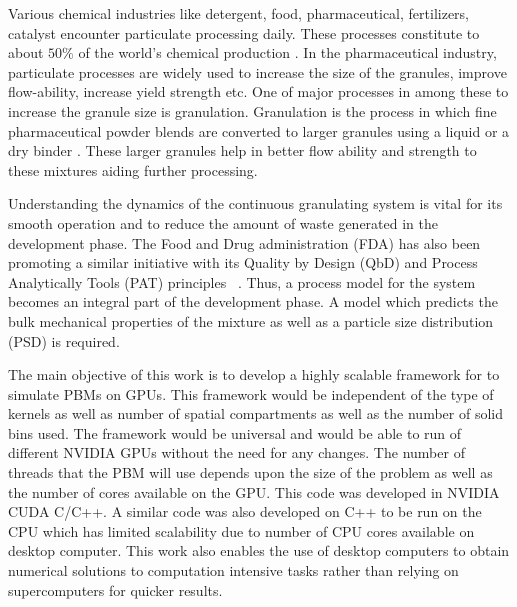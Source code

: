 \documentclass[preprint,10pt,authoryear,review]{elsarticle}
\begin{document}
\begin{linenumbers}
Various chemical industries like detergent, food, pharmaceutical, fertilizers, catalyst encounter 
particulate processing daily. 
These processes constitute to about $50\%$ of the world's chemical production \citep{seville1997}.
In the pharmaceutical industry, particulate processes are widely used to increase 
the size of the granules, improve flow-ability, increase yield strength etc. One of 
major processes in among these to increase the granule size is granulation. 
Granulation is the process in which fine pharmaceutical powder 
blends are converted to larger granules using a liquid or a dry binder \citep{Chaturbedi2017}. 
These larger granules help in better flow ability and strength to these mixtures 
aiding further processing. 

Understanding the dynamics of the continuous granulating system is vital for its smooth 
operation and to reduce the amount of waste generated in the development phase. The Food 
and Drug administration (FDA) has also been promoting a similar initiative with its 
Quality by Design (QbD) and Process Analytically Tools (PAT) principles~\citep{sen2014} 
\citep{FDAPAT2004}. Thus, a process model for the system becomes an integral part 
of the development phase. A model which predicts the bulk mechanical properties of the 
mixture as well as a particle size distribution (PSD) is required. 


The main objective of this work is to develop a highly scalable framework for to simulate 
PBMs on GPUs. This framework would be independent of the type of kernels as well as number 
of spatial compartments as well as the number of solid bins used. The framework would be 
universal and would be able to run of different NVIDIA GPUs without the need for any changes. 
The number of threads that the PBM will use depends upon the size of the problem as well as 
the number of cores available on the GPU. This code was developed in NVIDIA CUDA C/C++. 
A similar code was also developed on C++ to be run on the CPU which has limited scalability 
due to number of CPU cores available on desktop computer. This work also enables the use of 
desktop computers to obtain numerical solutions to computation intensive tasks rather than 
relying on supercomputers for quicker results.


%



\end{linenumbers}
\end{document}
